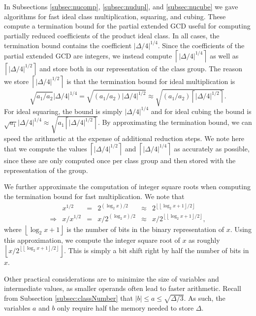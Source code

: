 \documentclass{ucalgthes1}
\theoremstyle{definition}
\newcommand{\floor}[1]{\left\lfloor #1 \right\rfloor}
\newcommand{\ceil}[1]{\left\lceil #1 \right\rceil}
\begin{document}
In Subsections \ref{subsec:nucomp}, \ref{subsec:nudupl}, and \ref{subsec:nucube} we gave algorithms for fast ideal class multiplication, squaring, and cubing.  These compute a termination bound for the partial extended GCD useful for computing partially reduced coefficients of the product ideal class.  In all cases, the termination bound contains the coefficient $|\Delta/4|^{1/4}$.  Since the coefficients of the partial extended GCD are integers, we instead compute $\ceil{|\Delta/4|^{1/4}}$ as well as $\ceil{|\Delta/4|^{1/2}}$ and store both in our representation of the class group.  The reason we store $\ceil{|\Delta/4|^{1/2}}$ is that the termination bound for ideal multiplication is
\[
\sqrt{a_1/a_2}|\Delta/4|^{1/4} = \sqrt{(a_1/a_2) |\Delta/4|^{1/2}} \approx \sqrt{(a_1/a_2) \ceil{|\Delta/4|^{1/2}}}.
\]
For ideal squaring, the bound is simply $|\Delta/4|^{1/4}$ and for ideal cubing the bound is $\sqrt{a_1}|\Delta/4|^{1/4} \approx \sqrt{a_1\ceil{|\Delta/4|^{1/2}}}$. By approximating the termination bound, we can speed the arithmetic at the expense of additional reduction steps. We note here that we compute the values $\ceil{|\Delta/4|^{1/2}}$ and $\ceil{|\Delta/4|^{1/4}}$ as accurately as possible, since these are only computed once per class group and then stored with the representation of the group.

We further approximate the computation of integer square roots when computing the termination bound for fast multiplication.  We note that 
\begin{equation*}
\begin{array}{rrlrlr}
	& x^{1/2} &=& 2^{(\log_2x)/2} &\approx& 2^{\floor{\floor{\log_2x+1}/2}} \\
	\Rightarrow & x / x^{1/2} &=& x / 2^{(\log_2x)/2} &\approx& x / 2^{\floor{\floor{\log_2x+1}/2}},
\end{array}
\end{equation*}
where $\floor{\log_2x+1}$ is the number of bits in the binary representation of $x$.  Using this approximation, we compute the integer square root of $x$ as roughly $\floor{x / 2^{\floor{\floor{\log_2x+1}/2}}}$.  This is simply a bit shift right by half the number of bits in $x$.

Other practical considerations are to minimize the size of variables and intermediate values, as smaller operands often lead to faster arithmetic.  Recall from Subsection \ref{subsec:classNumber} that $|b| \le a \le \sqrt{\Delta/3}$.  As such, the variables $a$ and $b$ only require half the memory needed to store $\Delta$.
\end{document}
